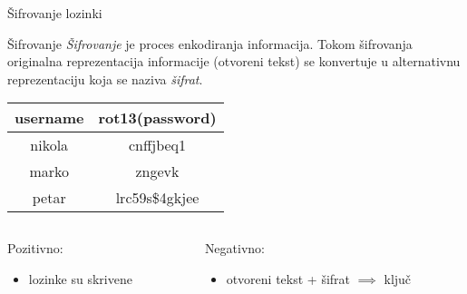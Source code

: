 \documentclass[aspectratio=169,xcolor=dvipsnames]{beamer}
\begin{document}
\begin{frame}{Šifrovanje lozinki}
    \begin{block}{Šifrovanje}
        \textit{Šifrovanje} je proces enkodiranja informacija. Tokom
        šifrovanja originalna reprezentacija informacije (otvoreni tekst)
        se konvertuje u alternativnu reprezentaciju koja se naziva
        \textit{šifrat}.
    \end{block}

    \vspace{1em}

    \begin{center}
        \begin{tabular}{c|c}
            username & rot13(password) \\
            \hline
            nikola & cnffjbeq1 \\
            marko & zngevk \\
            petar & lrc59s\$4gkjee
        \end{tabular}
    \end{center}

    \vspace{1em}

    \begin{columns}
        \begin{column}{0.4\textwidth}
            \pause
            Pozitivno:
            \pause
            \begin{itemize}
                \item lozinke su skrivene
            \end{itemize}
        \end{column}
        \begin{column}{0.4\textwidth}
            \pause
            Negativno:
            \pause
            \begin{itemize}
                \item otvoreni tekst + šifrat $\implies$ ključ
            \end{itemize}
        \end{column}
    \end{columns}

\end{frame}

\end{document}

